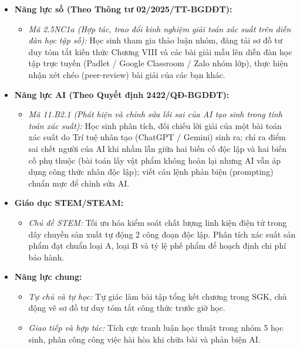 \documentclass[12pt, a4paper]{article}
\begin{document}
\begin{itemize}[leftmargin=1.2cm]
    \item \textbf{Năng lực số (Theo Thông tư 02/2025/TT-BGDĐT):}
    \begin{itemize}[leftmargin=0.6cm]
        \item \textit{Mã 2.5NC1a (Hợp tác, trao đổi kinh nghiệm giải toán xác suất trên diễn đàn học tập số):} Học sinh tham gia thảo luận nhóm, đăng tải sơ đồ tư duy tóm tắt kiến thức Chương VIII và các bài giải mẫu lên diễn đàn học tập trực tuyến (Padlet / Google Classroom / Zalo nhóm lớp), thực hiện nhận xét chéo (peer-review) bài giải của các bạn khác.
    \end{itemize}

    \item \textbf{Năng lực AI (Theo Quyết định 2422/QĐ-BGDĐT):}
    \begin{itemize}[leftmargin=0.6cm]
        \item \textit{Mã 11.B2.1 (Phát hiện và chỉnh sửa lỗi sai của AI tạo sinh trong tính toán xác suất):} Học sinh phân tích, đối chiếu lời giải của một bài toán xác suất do Trí tuệ nhân tạo (ChatGPT / Gemini) sinh ra; chỉ ra điểm sai chết người của AI khi nhầm lẫn giữa hai biến cố độc lập và hai biến cố phụ thuộc (bài toán lấy vật phẩm không hoàn lại nhưng AI vẫn áp dụng công thức nhân độc lập); viết câu lệnh phản biện (prompting) chuẩn mực để chỉnh sửa AI.
    \end{itemize}

    \item \textbf{Giáo dục STEM/STEAM:}
    \begin{itemize}[leftmargin=0.6cm]
        \item \textit{Chủ đề STEM:} Tối ưu hóa kiểm soát chất lượng linh kiện điện tử trong dây chuyền sản xuất tự động 2 công đoạn độc lập. Phân tích xác suất sản phẩm đạt chuẩn loại A, loại B và tỷ lệ phế phẩm để hoạch định chi phí bảo hành.
    \end{itemize}

    \item \textbf{Năng lực chung:}
    \begin{itemize}[leftmargin=0.6cm]
        \item \textit{Tự chủ và tự học:} Tự giác làm bài tập tổng kết chương trong SGK, chủ động vẽ sơ đồ tư duy tóm tắt công thức trước giờ học.
        \item \textit{Giao tiếp và hợp tác:} Tích cực tranh luận học thuật trong nhóm 5 học sinh, phân công công việc hài hòa khi chữa bài và phản biện AI.
    \end{itemize}
\end{itemize}
\end{document}

